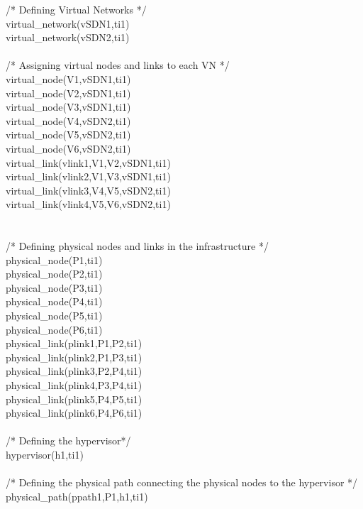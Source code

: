 \begin{myformula}
/* Defining Virtual Networks */\\
virtual\_network(vSDN1,ti1)\\
virtual\_network(vSDN2,ti1)\\
\textbf{\\}
/* Assigning virtual nodes and links to each VN */\\
virtual\_node(V1,vSDN1,ti1)\\
virtual\_node(V2,vSDN1,ti1)\\
virtual\_node(V3,vSDN1,ti1)\\
virtual\_node(V4,vSDN2,ti1)\\
virtual\_node(V5,vSDN2,ti1)\\
virtual\_node(V6,vSDN2,ti1)\\
virtual\_link(vlink1,V1,V2,vSDN1,ti1)\\
virtual\_link(vlink2,V1,V3,vSDN1,ti1)\\
virtual\_link(vlink3,V4,V5,vSDN2,ti1)\\
virtual\_link(vlink4,V5,V6,vSDN2,ti1)\\
\textbf{\\}
\textbf{\\}
/* Defining physical nodes and links in the infrastructure */\\
physical\_node(P1,ti1)\\
physical\_node(P2,ti1)\\
physical\_node(P3,ti1)\\
physical\_node(P4,ti1)\\
physical\_node(P5,ti1)\\
physical\_node(P6,ti1)\\
physical\_link(plink1,P1,P2,ti1)\\
physical\_link(plink2,P1,P3,ti1)\\
physical\_link(plink3,P2,P4,ti1)\\
physical\_link(plink4,P3,P4,ti1)\\
physical\_link(plink5,P4,P5,ti1)\\
physical\_link(plink6,P4,P6,ti1)\\
\textbf{\\}
/* Defining the hypervisor*/\\
hypervisor(h1,ti1)\\
\textbf{\\}
/* Defining the physical path connecting the physical nodes to the hypervisor */\\
physical\_path(ppath1,P1,h1,ti1)\\

\end{myformula}
